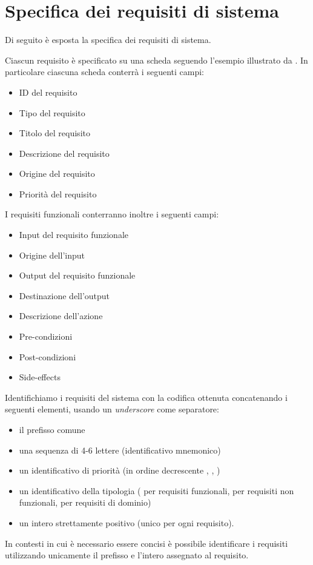 
\section{Specifica dei requisiti di sistema}

Di seguito \`e esposta la specifica dei requisiti di sistema.

Ciascun requisito \`e specificato su una scheda seguendo l'esempio illustrato da \cite[p. 97]{sommerville}.
In particolare ciascuna scheda conterr\`a i seguenti campi:
\begin{itemize}
	\item ID del requisito
	\item Tipo del requisito
	\item Titolo del requisito
	\item Descrizione del requisito
	\item Origine del requisito
	\item Priorit\`a del requisito
\end{itemize}
I requisiti funzionali conterranno inoltre i seguenti campi:
\begin{itemize}
	\item Input del requisito funzionale
	\item Origine dell'input
	\item Output del requisito funzionale
	\item Destinazione dell'output
	\item Descrizione dell'azione
	\item Pre-condizioni
	\item Post-condizioni
	\item Side-effects
\end{itemize}

Identifichiamo i requisiti del sistema con la codifica ottenuta concatenando i seguenti elementi, usando un \emph{underscore} come separatore:
\begin{itemize}
	\item il prefisso comune 
	\item una sequenza di 4-6 lettere (identificativo mnemonico)
	\item un identificativo di priorit\`a (in ordine decrescente , , )
	\item un identificativo della tipologia ( per requisiti funzionali,  per requisiti non funzionali,  per requisiti di dominio)
	\item un intero strettamente positivo (unico per ogni requisito).
\end{itemize}
In contesti in cui \`e necessario essere concisi \`e possibile identificare i requisiti utilizzando unicamente il prefisso  e l'intero assegnato al requisito.

